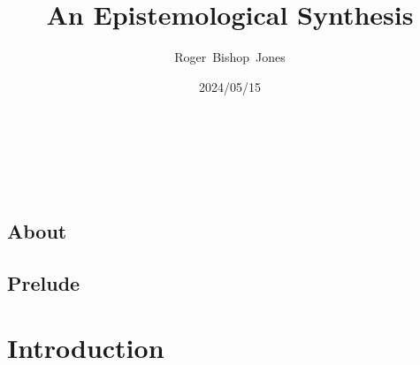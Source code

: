 \documentclass[10pt,titlepage]{book}
\title{\bf An Epistemological Synthesis}
\author{Roger~Bishop~Jones}
\date{\small 2024/05/15}
\newcommand{\ignore}[1]{}
\begin{document}
% 

                               
\begin{titlepage}
\maketitle





\end{titlepage}

\ \

\ignore{
\begin{centering}
{}
\end{centering}
}%

\setcounter{tocdepth}{2}
{\parskip-0pt\tableofcontents}


\hfill
\ 
\pagebreak







\section*{About}

\section*{Prelude}

\chapter{Introduction}
\end{document}

